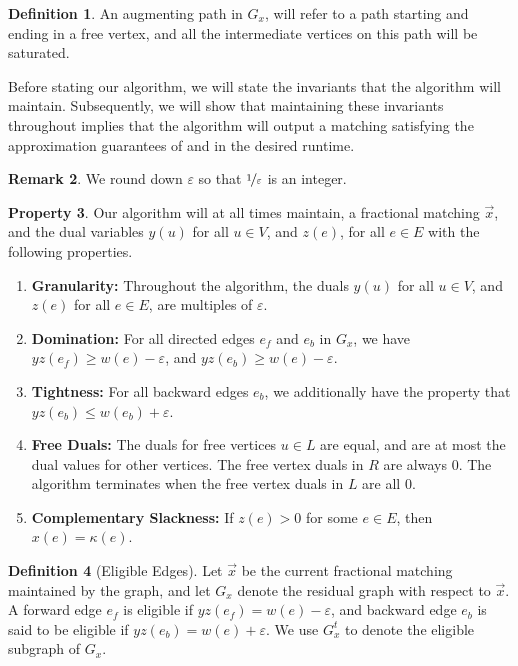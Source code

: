 \documentclass[a4paper,11pt]{article}
\newcommand{\eps}{\varepsilon}
\theoremstyle{definition}
\newtheorem{definition2}{Definition}
\theoremstyle{definition}
\theoremstyle{definition}
\newtheorem{property}[definition2]{Property}
\theoremstyle{definition}
\theoremstyle{definition}
\theoremstyle{definition}
\theoremstyle{definition}
\theoremstyle{definition}
\theoremstyle{definition}
\theoremstyle{definition}
\newtheorem{remark2}[definition2]{Remark}
\theoremstyle{definition}
\theoremstyle{definition}
\theoremstyle{definition}
\theoremstyle{definition}
\theoremstyle{definition}
\begin{document}
\begin{definition2}
    An augmenting path in $G_x$, will refer to a path starting and ending in a free vertex, and all the intermediate vertices on this path will be saturated.
\end{definition2}

Before stating our algorithm, we will state the invariants that the algorithm will maintain. Subsequently, we will show that maintaining these invariants throughout implies that the algorithm will output a matching satisfying the approximation guarantees of  and in the desired runtime. 

\begin{remark2}
We round down $\eps$ so that $\nicefrac{1}{\eps}$ is an integer.
\end{remark2}

\begin{property}\label{prop:invariants}
Our algorithm will at all times maintain, a fractional matching $\vec{x}$, and the dual variables $y(u)$ for all $u\in V$, and $z(e)$, for all $e\in E$ with the following properties.
\begin{enumerate}
    \item \textbf{Granularity:} Throughout the algorithm, the duals $y(u)$ for all $u\in V$, and $z(e)$ for all $e\in E$, are multiples of $\eps$. \label{item:gran}
    \item \textbf{Domination:} For all directed edges $e_f$ and $e_b$ in $G_{x}$, we have $yz(e_f)\geqslant w(e)-\eps$, and $yz(e_b)\geqslant w(e)-\eps$.\label{item:domin}
    \item \textbf{Tightness:} For all backward edges $e_b$, we additionally have the property that $yz(e_b)\leqslant w(e_b)+\eps$. \label{item:tightness}
    \item \textbf{Free Duals:} The duals for free vertices $u\in L$ are equal, and are at most the dual values for other vertices. The free vertex duals in $R$ are always $0$. The algorithm terminates when the free vertex duals in $L$ are all $0$. \label{item:freeduals}
    \item \textbf{Complementary Slackness:} If $z(e)>0$ for some $e\in E$, then $x(e)=\kappa(e)$. \label{item:slackness}
\end{enumerate}
\end{property}

\begin{definition2}[Eligible Edges]
    Let $\vec{x}$ be the current fractional matching maintained by the graph, and let $G_{x}$ denote the residual graph with respect to $\vec{x}$. A forward edge $e_f$ is eligible if $yz(e_f) = w(e)-\eps$, and backward edge $e_b$ is said to be eligible if $yz(e_b)=w(e)+\eps$. We use $G^t_x$ to denote the eligible subgraph of $G_x$. 
\end{definition2}
\end{document}
